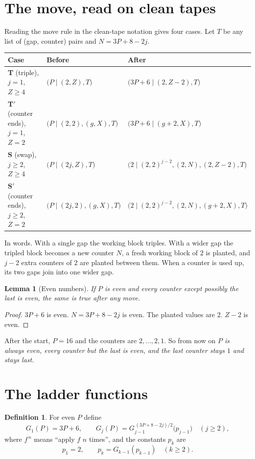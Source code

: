 \documentclass[11pt]{article}
\newtheorem{lemma}{Lemma}
\theoremstyle{definition}
\newtheorem{definition}{Definition}
\theoremstyle{remark}
\newcommand{\st}[2]{\bigl(#1 \mid #2\bigr)}
\begin{document}
\section{The move, read on clean tapes}

Reading the move rule in the clean-tape notation gives four cases. Let $T$ be
any list of (gap, counter) pairs and $N=3P+8-2j$.

\begin{center}\small
\begin{tabular}{@{}lll@{}}
\toprule
Case & Before & After \\
\midrule
\textbf{T} (triple), $j=1$, $Z\ge 4$ & $\st{P}{(2,Z),T}$ & $\st{3P+6}{(2,Z-2),T}$ \\
\textbf{T$'$} (counter ends), $j=1$, $Z=2$ & $\st{P}{(2,2),(g,X),T}$ & $\st{3P+6}{(g+2,X),T}$ \\
\textbf{S} (swap), $j\ge 2$, $Z\ge 4$ & $\st{P}{(2j,Z),T}$ & $\st{2}{(2,2)^{j-2},(2,N),(2,Z-2),T}$ \\
\textbf{S$'$} (counter ends), $j\ge 2$, $Z=2$ & $\st{P}{(2j,2),(g,X),T}$ & $\st{2}{(2,2)^{j-2},(2,N),(g+2,X),T}$ \\
\bottomrule
\end{tabular}
\end{center}

In words. With a single gap the working block triples. With a wider gap the
tripled block becomes a new counter $N$, a fresh working block of $2$ is planted,
and $j-2$ extra counters of $2$ are planted between them. When a counter is used
up, its two gaps join into one wider gap.

\begin{lemma}[Even numbers]\label{even}
If $P$ is even and every counter except possibly the last is even, the same is
true after any move.
\end{lemma}
\begin{proof}
$3P+6$ is even. $N=3P+8-2j$ is even. The planted values are $2$. $Z-2$ is even.
\end{proof}

After the start, $P=16$ and the counters are $2,\dots,2,1$. So from now on
\emph{$P$ is always even, every counter but the last is even, and the last
counter stays $1$ and stays last.}

\section{The ladder functions}

\begin{definition}\label{G}
For even $P$ define
\[
G_1(P)=3P+6,\qquad
G_j(P)=G_{j-1}^{\,(3P+8-2j)/2}\bigl(p_{j-1}\bigr)\quad (j\ge 2),
\]
where $f^{\,n}$ means ``apply $f$ $n$ times'', and the constants $p_k$ are
\[
p_1=2,\qquad p_{k}=G_{k-1}(p_{k-1})\quad(k\ge 2).
\]
\end{definition}
\end{document}
